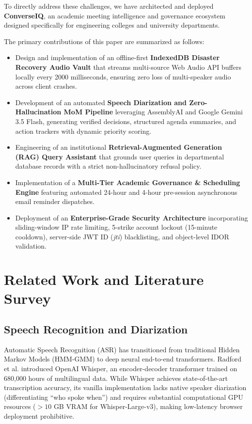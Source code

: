 \documentclass[conference]{IEEEtran}
\begin{document}
To directly address these challenges, we have architected and deployed \textbf{ConverseIQ}, an academic meeting intelligence and governance ecosystem designed specifically for engineering colleges and university departments. 

The primary contributions of this paper are summarized as follows:
\begin{itemize}
    \item Design and implementation of an offline-first \textbf{IndexedDB Disaster Recovery Audio Vault} that streams multi-source Web Audio API buffers locally every 2000 milliseconds, ensuring zero loss of multi-speaker audio across client crashes.
    \item Development of an automated \textbf{Speech Diarization and Zero-Hallucination MoM Pipeline} leveraging AssemblyAI and Google Gemini 3.5 Flash, generating verified decisions, structured agenda summaries, and action trackers with dynamic priority scoring.
    \item Engineering of an institutional \textbf{Retrieval-Augmented Generation (RAG) Query Assistant} that grounds user queries in departmental database records with a strict non-hallucinatory refusal policy.
    \item Implementation of a \textbf{Multi-Tier Academic Governance & Scheduling Engine} featuring automated 24-hour and 4-hour pre-session asynchronous email reminder dispatches.
    \item Deployment of an \textbf{Enterprise-Grade Security Architecture} incorporating sliding-window IP rate limiting, 5-strike account lockout (15-minute cooldown), server-side JWT ID (\textit{jti}) blacklisting, and object-level IDOR validation.
\end{itemize}

\section{Related Work and Literature Survey}

\subsection{Speech Recognition and Diarization}
Automatic Speech Recognition (ASR) has transitioned from traditional Hidden Markov Models (HMM-GMM) to deep neural end-to-end transformers. Radford et al. \cite{whisper} introduced OpenAI Whisper, an encoder-decoder transformer trained on 680,000 hours of multilingual data. While Whisper achieves state-of-the-art transcription accuracy, its vanilla implementation lacks native speaker diarization (differentiating ``who spoke when'') and requires substantial computational GPU resources ($>10$ GB VRAM for Whisper-Large-v3), making low-latency browser deployment prohibitive.
\end{document}
